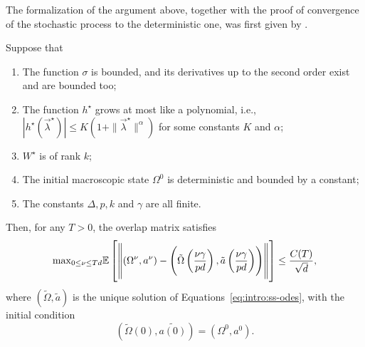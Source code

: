 The formalization of the argument above, together with the proof of convergence of the stochastic process to the deterministic one, was first given by \citet{goldt2019dynamics}. 
\begin{theorem} \label{thm:intro:ss-convergence}
    Suppose that
  \begin{enumerate}
    \item The function \(\sigma\) is bounded, and its derivatives up to the second order exist and are bounded too;
    \item The function \(h^\star\) grows at most like a polynomial, i.e., \(|h^\star(\vec{\lambda}^\star)| \le K(1 + \|\vec{\lambda}^\star\|^\alpha)\) for some constants \(K\) and \(\alpha\);
    \item \(W^\star\) is of rank \(k\);
    \item The initial macroscopic state \({\Omega^0}\) is deterministic and bounded by a constant;
    \item The constants \(\Delta, p, k\) and \(\gamma\) are all finite.
  \end{enumerate}
  Then, for any \(T>0\), the overlap matrix satisfies
  \begin{equation}
    {\rm max}_{0\le\nu\le Td} \mathbb{E}\left[
      \left\|({\Omega}^\nu,a^\nu) - \left(\tilde{{\Omega}}\left(\frac{\nu\gamma}{pd}\right), \tilde{a}\left(\frac{\nu\gamma}{pd}\right)\right)\right\|
    \right]
    \le
    \frac{C{(T)}}{\sqrt{d}},
  \end{equation}
  where \(\left(\tilde{{\Omega}}, \tilde{a}\right)\) is the unique solution of Equations~\eqref{eq:intro:ss-odes},
  with the initial condition \[\left(\tilde{{\Omega}}{(0)}, \tilde{a{(0)}}\right) = \left(\Omega^0, a^0\right).\]
\end{theorem}

